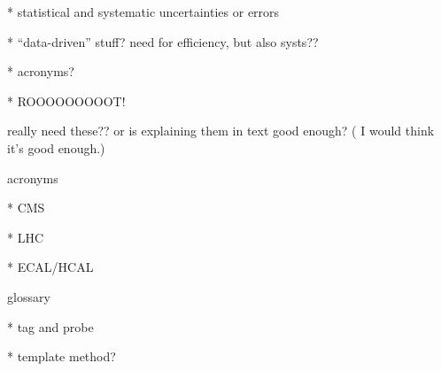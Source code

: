   * statistical and systematic uncertainties or errors

   * ``data-driven'' stuff?  need for efficiency, but also systs??

   * acronyms?  

   * ROOOOOOOOOT!




really need these??  or is explaining them in text good enough?  (
I would think it's good enough.)

acronyms

   * CMS

   * LHC

   * ECAL/HCAL



glossary

   * tag and probe

   * template method?